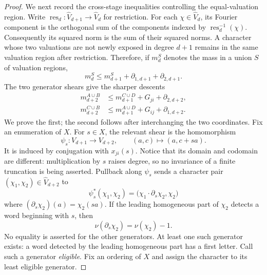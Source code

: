 \documentclass[11pt]{amsart}
\theoremstyle{definition}
\theoremstyle{plain}
\begin{document}
\begin{proof}
We next record the cross-stage inequalities controlling the
equal-valuation region.  Write
\(\operatorname{res}_d:\widehat V_{d+1}\to\widehat V_d\) for
restriction.  For each \(\chi\in\widehat V_d\), its Fourier component
is the orthogonal sum of the components indexed by
\(\operatorname{res}_d^{-1}(\chi)\).  Consequently its squared norm is
the sum of their squared norms.  A character whose two valuations are
not newly exposed in degree \(d+1\) remains in the same valuation
region after restriction.  Therefore, if \(m_d^S\) denotes the mass
in a union \(S\) of valuation regions,
\begin{equation}\label{eq:stage-monotonicity}
 m_d^S\le m_{d+1}^S+\partial_{1,d+1}+\partial_{2,d+1}.
\end{equation}
The two generator shears give the sharper descents
\begin{align}
 m_{d+2}^{A\cup B}
 &\le m_{d+1}^{C\cup D}+G_{ji}+\partial_{2,d+2},
 \label{eq:AB-descent}\\
 m_{d+2}^{C\cup B}
 &\le m_{d+1}^{A\cup D}+G_{ij}+\partial_{1,d+2}.
 \label{eq:CB-descent}
\end{align}
We prove the first; the second follows after interchanging the two
coordinates.  Fix an enumeration of \(X\).  For \(s\in X\), the
relevant shear is the homomorphism
\[
 \psi_s:V_{d+1}\longrightarrow V_{d+2},
 \qquad (a,c)\longmapsto(a,c+sa).
\]
It is induced by conjugation with \(x_{ji}(s)\).  Notice that its
domain and codomain are different: multiplication by \(s\) raises
degree, so no invariance of a finite truncation is being asserted.
Pullback along \(\psi_s\) sends a character pair
\((\chi_1,\chi_2)\in\widehat V_{d+2}\) to
\[
 \psi_s^*(\chi_1,\chi_2)=
 \bigl(\chi_1\cdot\partial_s\chi_2,\chi_2\bigr)
\]
where \((\partial_s\chi_2)(a)=\chi_2(sa)\).  If the leading
homogeneous part of \(\chi_2\) detects a word beginning with \(s\),
then
\[
 \nu(\partial_s\chi_2)=\nu(\chi_2)-1.
\]
No equality is asserted for the other generators.  At least one such
generator exists: a word detected by the leading homogeneous part has
a first letter.  Call such a generator \emph{eligible}.  Fix an
ordering of \(X\) and assign the character to its least eligible
generator.


\end{proof}
\end{document}
